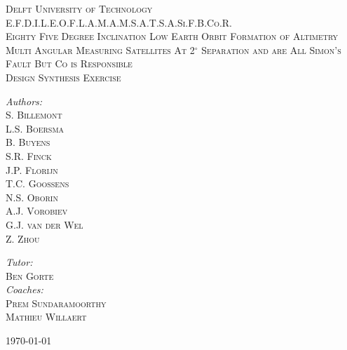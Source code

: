 \begin{titlepage}
\begin{center}

\textsc{\LARGE Delft University of Technology}\\[1.5cm]

\textsc{\Large E.F.D.I.L.E.O.F.L.A.M.A.M.S.A.T.S.A.Si.F.B.Co.R.}\\[0.5cm]
\textsc{\small Eighty Five Degree Inclination Low Earth Orbit Formation of Altimetry Multi Angular Measuring Satellites At 2$^{\circ}$ Separation and are All Simon's Fault But Co is Responsible}\\[1.5cm]
\textsc{\large Design Synthesis Exercise}\\[2.5cm]

\begin{minipage}{0.4\textwidth}
\begin{flushleft} \large
\emph{Authors:}\\
\textsc{S. Billemont\\
L.S. Boersma\\
B. Buyens\\
S.R. Finck\\
J.P. Florijn\\
T.C. Goossens\\
N.S. Oborin\\
A.J. Vorobiev\\
G.J. van der Wel\\
Z. Zhou\\}
\end{flushleft}
\end{minipage}
\begin{minipage}{0.4\textwidth}
\begin{flushright}
\emph{Tutor:}\\
\textsc{Ben Gorte}\\[1cm]
\emph{Coaches:}\\
\textsc{Prem Sundaramoorthy\\
Mathieu Willaert}
\end{flushright}
\end{minipage}
\vfill

\today
\end{center}
\end{titlepage}